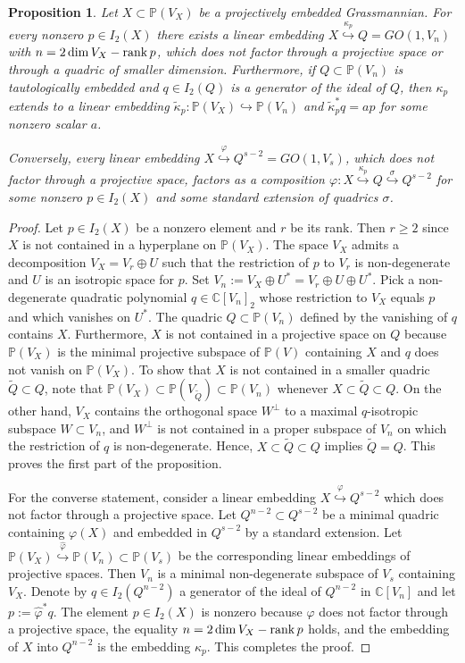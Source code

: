\documentclass[12pt]{amsart}
\def\CC {{\mathbb C}}     %
\def\PP {{\mathbb P}}     %
\newtheorem{prop}[theorem]{Proposition}
\begin{document}
\begin{prop}\label{Prop embed in quadric}
Let $X\subset\PP(V_X)$ be a projectively embedded Grassmannian. For every nonzero $p\in I_2(X)$ there exists a linear embedding $X\stackrel{\kappa_p}{\hookrightarrow} Q=GO(1,V_n)$ with $n=2\dim V_X-{\rm rank}\,p$, which does not factor through a projective space or through a quadric of smaller dimension. Furthermore, if $Q\subset\PP(V_n)$ is tautologically embedded and $q\in I_2(Q)$ is a generator of the ideal of $Q$, then $\kappa_p$ extends to a linear embedding $\tilde\kappa_p:\PP(V_X)\hookrightarrow \PP(V_n)$ and $\tilde\kappa_p^*q=ap$ for some nonzero scalar $a$.

Conversely, every linear embedding $X\stackrel{\varphi}{\hookrightarrow} Q^{s-2}=GO(1,V_s)$, which does not factor through a projective space, factors as a composition $\varphi: X\stackrel{\kappa_p}{\hookrightarrow} Q \stackrel{\sigma}{\hookrightarrow} Q^{s-2}$ for some nonzero $p\in I_2(X)$ and some standard extension of quadrics $\sigma$.
\end{prop}

\begin{proof}
Let $p\in I_2(X)$ be a nonzero element and $r$ be its rank. Then $r\geq2$ since $X$ is not contained in a hyperplane on $\PP(V_X)$. The space $V_X$ admits a decomposition $V_X=V_r\oplus U$ such that the restriction of $p$ to $V_r$ is non-degenerate and $U$ is an isotropic space for $p$. Set $V_n:=V_X\oplus U^*=V_r\oplus U\oplus U^*$. Pick a non-degenerate quadratic polynomial $q\in \CC[V_n]_2$ whose restriction to $V_X$ equals $p$ and which vanishes on $U^*$. The quadric $Q\subset\PP(V_n)$ defined by the vanishing of $q$ contains $X$. Furthermore, $X$ is not contained in a projective space on $Q$ because $\PP(V_X)$ is the minimal projective subspace of $\PP(V)$ containing $X$ and $q$ does not vanish on $\PP(V_X)$. To show that $X$ is not contained in a smaller quadric $\tilde Q\subset Q$, note that $\PP(V_X)\subset \PP(V_{\tilde Q})\subset\PP(V_n)$ whenever $X\subset \tilde Q\subset Q$. On the other hand, $V_X$ contains the orthogonal space $W^\perp$ to a maximal $q$-isotropic subspace $W\subset V_n$, and $W^\perp$ is not contained in a proper subspace of $V_n$ on which the restriction of $q$ is non-degenerate. Hence, $X\subset \tilde Q\subset Q$ implies $\tilde Q=Q$. This proves the first part of the proposition.

For the converse statement, consider a linear embedding $X\stackrel{\varphi}{\hookrightarrow} Q^{s-2}$ which does not factor through a projective space. Let $Q^{n-2}\subset Q^{s-2}$ be a minimal quadric containing $\varphi(X)$ and embedded in $Q^{s-2}$ by a standard extension. Let $\PP(V_X)\stackrel{\hat\varphi}{\hookrightarrow}\PP(V_n)\subset \PP(V_s)$ be the corresponding linear embeddings of projective spaces. Then $V_n$ is a minimal non-degenerate subspace of $V_s$ containing $V_X$. Denote by $q\in I_2(Q^{n-2})$ a generator of the ideal of $Q^{n-2}$ in $\CC[V_n]$ and let $p:=\hat\varphi^*q$. The element $p\in I_2(X)$ is nonzero because $\varphi$ does not factor through a projective space, the equality $n=2\dim V_X-{\rm rank}\,p$ holds, and the embedding of $X$ into $Q^{n-2}$ is the embedding $\kappa_p$. This completes the proof.
\end{proof}
\end{document}
